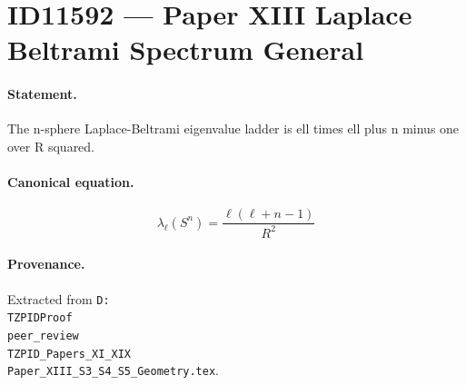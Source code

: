\section*{ID11592 --- Paper XIII Laplace Beltrami Spectrum General}

\paragraph{Statement.}
The n-sphere Laplace-Beltrami eigenvalue ladder is ell times ell plus n minus one over R squared.

\paragraph{Canonical equation.}
\[
\lambda_\ell(S^n)=\frac{\ell(\ell+n-1)}{R^2}
\]

\paragraph{Provenance.}
Extracted from \texttt{D:\\TZPIDProof\\peer\_review\\TZPID\_Papers\_XI\_XIX\\Paper\_XIII\_S3\_S4\_S5\_Geometry.tex}.
